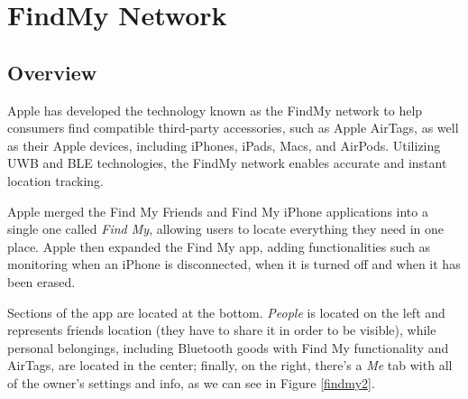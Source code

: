 \documentclass[english]{article}
\begin{document}
\section{FindMy Network}\label{sec:find}
\subsection{Overview}
Apple has developed the technology known as the FindMy network to help consumers find compatible third-party accessories, such as Apple AirTags, as well as their Apple devices, including iPhones, iPads, Macs, and AirPods. Utilizing UWB and BLE technologies, the FindMy network enables accurate and instant location tracking.

Apple merged the Find My Friends and Find My iPhone applications into a single one called \textit{Find My}, allowing users to locate everything they need in one place. Apple then expanded the Find My app, adding functionalities such as monitoring when an iPhone is disconnected, when it is turned off and when it has been erased.

Sections of the app are located at the bottom. \textit{People} is located on the left and represents friends location (they have to share it in order to be visible), while personal belongings, including Bluetooth goods with Find My functionality and AirTags, are located in the center; finally, on the right, there's a \textit{Me} tab with all of the owner's settings and info, as we can see in Figure \ref{findmy2}.
\end{document}

